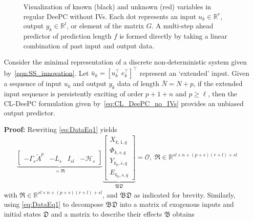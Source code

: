 \begin{figure}[b!]
\centering

\caption{Visualization of known (black) and unknown (red) variables in regular \ac{DeePC} without \ac{IVs}. Each dot represents an input $u_k\in\mathbb{R}^r$, output $y_k\in\mathbb{R}^l$, or element of the matrix $G$. A multi-step ahead predictor of prediction length $f$ is formed directly by taking a linear combination of past input and output data.\\\vspace{0.75mm}}
\label{fig:regular-DeePC}
\end{figure}
%
\begin{thm}\label{theorem:main_result}
    Consider the minimal representation of a discrete non-deterministic system given by~\eqref{eqn:SS_innovation}. Let $\bar{u}_k=\left[u_k^\top \; e_k^\top\right]^\top$ represent an `extended' input. Given a sequence of input $u_k$ and output $y_k$ data of length $\bar{N}=N+p$, if the extended input sequence is persistently exciting of order $p+1+n$ and $p\geq\ell$, then the \ac{CL-DeePC} formulation given by~\eqref{eq:CL_DeePC_no_IVs} provides an unbiased output predictor.%
\end{thm}
\textbf{Proof:} 
Rewriting \eqref{eq:DataEq1} yields
\begin{align*}
    \underbrace{\begin{bmatrix}-\Gamma_s \tilde{A}^p & -L_s & I_{sl}&-\mathcal{H}_s\end{bmatrix}}_{= \mathfrak{R}}
    \underbrace{\begin{bmatrix}
        X_{k,1,q}\\
        \Phi_{k,s,q}\\
        Y_{k_p,s,q}\\
        E_{k_p,s,q}
    \end{bmatrix}}_{\mathfrak{B}\mathfrak{D}}=\mathcal{O},\;\mathfrak{R}\in\mathbb{R}^{sl\times n+(p+s)(r+l)+sl}
\end{align*}
with $\mathfrak{R}\in\mathbb{R}^{sl\times n+(p+s)(r+l)+sl}$, and $\mathfrak{BD}$ as indicated for brevity. Similarly, using \eqref{eq:DataEq1} to decompose $\mathfrak{BD}$ into a matrix of exogenous inputs and initial states $\mathfrak{D}$ and a matrix to describe their effects $\mathfrak{B}$ obtains
